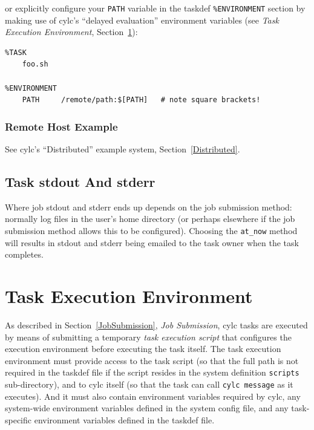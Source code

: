 \documentclass[11pt,a4paper]{article}
\begin{document}
or explicitly configure your \lstinline=PATH= variable in the taskdef
\lstinline=%ENVIRONMENT= section by making use of cylc's ``delayed
evaluation'' environment variables (see {\em Task Execution
Environment}, Section~\ref{TaskExecutionEnvironment}):

\begin{lstlisting}
%TASK
    foo.sh

%ENVIRONMENT
    PATH     /remote/path:$[PATH]   # note square brackets!
\end{lstlisting}

\subsubsection{Remote Host Example}

See cylc's ``Distributed'' example system, Section~\ref{Distributed}.


\subsection{Task stdout And stderr}
\label{TaskstdoutAndstderr}

Where job stdout and stderr ends up depends on the job submission
method: normally log files in the user's home directory (or perhaps
elsewhere if the job submission method allows this to be configured).
Choosing the \lstinline=at_now= method will results in stdout and
stderr being emailed to the task owner when the task completes.

\pagebreak
\section{Task Execution Environment}
\label{TaskExecutionEnvironment}

As described in Section~\ref{JobSubmission}, {\em Job Submission}, cylc
tasks are executed by means of submitting a temporary {\em task
execution script} that configures the execution environment before
executing the task itself.  The task execution environment must provide
access to the task script (so that the full path is not required in the
taskdef file if the script resides in the system definition
\lstinline=scripts= sub-directory), and to cylc itself (so that the task
can call \lstinline=cylc message= as it executes). And it must also
contain environment variables required by cylc, any system-wide
environment variables defined in the system config file, and any
task-specific environment variables defined in the taskdef file.
\end{document}
